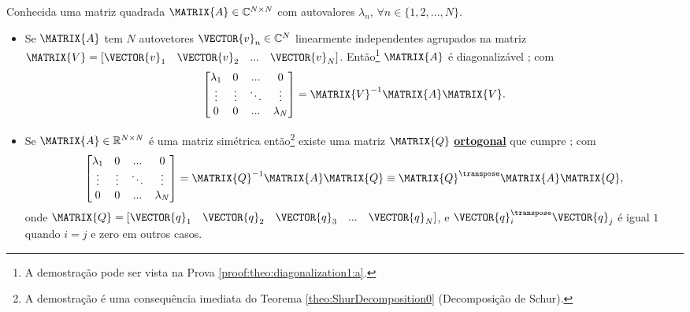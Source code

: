 \begin{theorem}\label{theo:diagonalization1}
Conhecida uma matriz quadrada $\MATRIX{A} \in \mathbb{C}^{N \times N}$ com
autovalores $\lambda_n$, $\forall n \in \{1, 2, ..., N\}$.
\begin{itemize}
\item Se $\MATRIX{A}$ tem $N$  autovetores $\VECTOR{v}_n \in \mathbb{C}^{N}$  linearmente independentes
agrupados na matriz $\MATRIX{V}=\left[\VECTOR{v}_1\quad \VECTOR{v}_2\quad  ...\quad \VECTOR{v}_N\right]$.
Então\footnote{A demostração pode ser vista na Prova \ref{proof:theo:diagonalization1:a}.} 
$\MATRIX{A}$ é diagonalizável \cite[pp. 67]{golub2013matrix} \cite[pp. 61]{axelsson1996iterative};
com
\begin{equation}
\begin{bmatrix}
\lambda_1 & 0         & ...    & 0 \\
\vdots    & \vdots    & \ddots & \vdots \\
0         & 0         & ...    & \lambda_N
\end{bmatrix}
=\MATRIX{V}^{-1}\MATRIX{A}\MATRIX{V}.
\end{equation}
\item Se $\MATRIX{A}\in \mathbb{R}^{N \times N}$ é uma matriz simétrica então\footnote{A
demostração é uma consequência imediata do Teorema \ref{theo:ShurDecomposition0} (Decomposição de Schur).}
existe uma matriz $\MATRIX{Q}$ \hyperref[def:ortogonalmatrix0]{\textbf{ortogonal}} que cumpre \cite[pp. 67, 440]{golub2013matrix};
com
\begin{equation}
\begin{bmatrix}
\lambda_1 & 0         & ...    & 0 \\
\vdots    & \vdots    & \ddots & \vdots \\
0         & 0         & ...    & \lambda_N
\end{bmatrix}
=\MATRIX{Q}^{-1}\MATRIX{A}\MATRIX{Q}
\equiv \MATRIX{Q}^{\transpose}\MATRIX{A}\MATRIX{Q},
\end{equation}
onde $\MATRIX{Q}=\left[\VECTOR{q}_1\quad \VECTOR{q}_2\quad \VECTOR{q}_3\quad ...\quad \VECTOR{q}_N\right]$,
e $\VECTOR{q}_i^{\transpose}\VECTOR{q}_j$ é igual $1$ quando $i=j$ e zero em outros casos.
\end{itemize}
\end{theorem}
